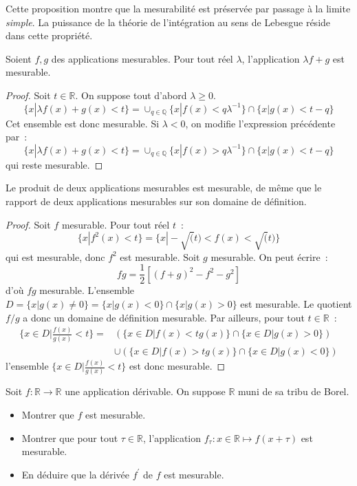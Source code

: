 Cette proposition montre que la mesurabilité est préservée par passage
à la limite {\em simple}. La puissance de la théorie de l'intégration
au sens de Lebesgue réside dans cette propriété.
\begin{mandatory}
\begin{prop}
Soient $f,g$ des applications mesurables. Pour tout réel $\lambda$, l'application $\lambda f + g
$ est mesurable.
\end{prop}
\end{mandatory}
\begin{proof}
Soit $t  \in \mathbb{R}$. On suppose tout d'abord $\lambda \geq 0$.
\[
\{ x | \lambda f(x) + g(x) < t \}  = \cup_{q \in \mathbb{Q}} \{ x |
f(x) < q \lambda^{-1} \} \cap \{ x | g(x) < t - q\}
\]
Cet ensemble est donc mesurable.
Si $\lambda < 0$, on modifie l'expression précédente par~:
\[
\{ x | \lambda f(x) + g(x) < t \}  = \cup_{q \in \mathbb{Q}} \{ x |
f(x) > q \lambda^{-1} \} \cap \{ x | g(x) < t - q\}
\]
qui reste mesurable.
\end{proof}
\begin{mandatory}
\begin{prop}
Le produit de deux applications mesurables est mesurable, de même que
le rapport de deux applications mesurables sur son domaine de définition.
\end{prop}
\end{mandatory}
\begin{proof}
Soit $f$ mesurable. Pour tout réel $t$~:
\[
\{x | f^2(x) < t \} = \{ x | -\sqrt(t) < f(x) < \sqrt(t) \}
\]
qui est mesurable, donc $f^2$ est mesurable. 
Soit $g$ mesurable. On peut écrire~:
\[
fg = \frac{1}{2} [(f+g)^2 -f^2 - g^2]
\]
d'où $fg$ mesurable.
L'ensemble $D = \{x | g(x) \neq 0 \} = \{ x | g(x) < 0 \} \cap \{x |
g(x) > 0\}$ est mesurable. Le quotient $f/g$ a donc un domaine de
définition mesurable. Par ailleurs, pour tout $t \in \mathbb{R}$~:
\begin{align*}
\{x \in D | \frac{f(x)}{g(x)} < t \} = & \left ( \{x \in D | f(x) < t g(x) \}
\cap \{x \in D | g(x) > 0\} \right ) \\
& \cup \left (\{x \in D | f(x) > t g(x) \}
\cap \{x \in D | g(x) < 0 \} \right )
\end{align*}
l'ensemble $\{x \in D | \frac{f(x)}{g(x)} < t \}$ est donc mesurable.
\end{proof}
\begin{exercice}
Soit $f \colon \mathbb{R} \to \mathbb{R}$ une application dérivable. On suppose
$\mathbb{R}$ muni de sa tribu de Borel. 
\begin{itemize}
  \item Montrer que $f$ est mesurable.
  \item Montrer que pour tout $\tau \in \mathbb{R}$, l'application $f_\tau
  \colon x \in \mathbb{R} \mapsto f(x+\tau)$ est mesurable.
  \item En déduire que la dérivée $f^\prime$ de $f$ est mesurable. 
\end{itemize}
\end{exercice}
